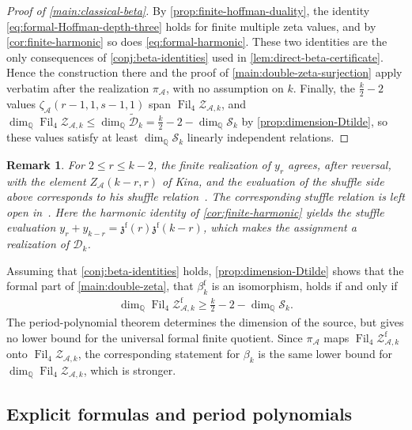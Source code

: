\documentclass[12pt]{amsart}
\numberwithin{equation}{section}
\theoremstyle{plain}
\newtheorem{rem}[rem]{Remark}
\newcommand{\QQ}{\mathbb{Q}}
\DeclareMathOperator{\Fil}{Fil}
\newcommand{\ZAw}[1]{{\mathcal Z_{\mathcal A,#1}}}
\newcommand{\ZAfw}[1]{{\mathcal Z_{\mathcal A,#1}^{\mathrm f}}}
\newcommand{\za}[1]{\zeta_{\mathcal A}(#1)}
\newcommand{\zzf}[1]{\mathfrak z^{\mathrm f}(#1)}
\newcommand{\Dk}{\mathcal D_k}
\newcommand{\Dtk}{\widetilde{\mathcal D}_k}
\begin{document}
\begin{proof}[Proof of \cref{main:classical-beta}]
By \cref{prop:finite-hoffman-duality}, the identity
\eqref{eq:formal-Hoffman-depth-three} holds for finite multiple zeta
values, and by \cref{cor:finite-harmonic} so does
\eqref{eq:formal-harmonic}. These two identities are the only
consequences of \cref{conj:beta-identities} used in
\cref{lem:direct-beta-certificate}. Hence the construction there and
the proof of \cref{main:double-zeta-surjection} apply verbatim after
the realization $\pi_{\mathcal A}$, with no assumption on $k$. Finally, the $\frac k2-2$ values
$\za{r-1,1,s-1,1}$ span $\Fil_4\ZAw{k}$, and
$\dim_{\QQ}\Fil_4\ZAw{k}\leq\dim_{\QQ}\Dtk
=\frac k2-2-\dim_{\QQ}\mathcal S_k$ by
\cref{prop:dimension-Dtilde}, so these values satisfy at least
$\dim_{\QQ}\mathcal S_k$ linearly independent relations.
\end{proof}

\begin{rem}\label{rem:kina-comparison}
For $2\leq r\leq k-2$, the finite realization of $y_r$ agrees, after
reversal, with the element $Z_{\mathcal A}(k-r,r)$ of Kina, and the
evaluation of the shuffle side above corresponds to his shuffle
relation~\cite{Kina}. The corresponding stuffle relation is left open
in~\cite{Kina}. Here the harmonic identity of
\cref{cor:finite-harmonic} yields the stuffle evaluation
$y_r+y_{k-r}=\zzf r\zzf{k-r}$, which makes the assignment a
realization of $\Dk$.
\end{rem}

Assuming that \cref{conj:beta-identities} holds,
\cref{prop:dimension-Dtilde} shows that the formal part of
\cref{main:double-zeta}, that $\beta_k^{\mathrm f}$ is an isomorphism,
holds if and only if
\begin{align}\label{eq:sharp-depth-four-bound}
 \dim_{\QQ}\Fil_4\ZAfw{k}\geq
 \frac{k}{2}-2-\dim_{\QQ}\mathcal S_k.
\end{align}
The period-polynomial theorem determines the dimension of the source,
but gives no lower bound for the universal formal finite quotient.
Since $\pi_{\mathcal A}$ maps $\Fil_4\ZAfw{k}$ onto $\Fil_4\ZAw{k}$,
the corresponding statement for $\beta_k$ is the same lower bound for
$\dim_{\QQ}\Fil_4\ZAw{k}$, which is stronger.

\subsection{Explicit formulas and period polynomials}
\label{subsec:explicit-period}
\end{document}
